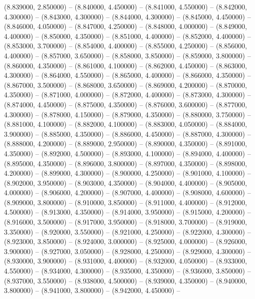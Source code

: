 (8.839000, 2.850000) -- 
(8.840000, 4.450000) -- 
(8.841000, 4.550000) -- 
(8.842000, 4.300000) -- 
(8.843000, 4.300000) -- 
(8.844000, 4.300000) -- 
(8.845000, 4.450000) -- 
(8.846000, 4.050000) -- 
(8.847000, 4.250000) -- 
(8.848000, 4.000000) -- 
(8.849000, 4.400000) -- 
(8.850000, 4.350000) -- 
(8.851000, 4.400000) -- 
(8.852000, 4.400000) -- 
(8.853000, 3.700000) -- 
(8.854000, 4.400000) -- 
(8.855000, 4.250000) -- 
(8.856000, 4.400000) -- 
(8.857000, 3.650000) -- 
(8.858000, 3.850000) -- 
(8.859000, 3.800000) -- 
(8.860000, 4.350000) -- 
(8.861000, 4.100000) -- 
(8.862000, 4.450000) -- 
(8.863000, 4.300000) -- 
(8.864000, 4.550000) -- 
(8.865000, 4.400000) -- 
(8.866000, 4.350000) -- 
(8.867000, 3.500000) -- 
(8.868000, 3.650000) -- 
(8.869000, 4.200000) -- 
(8.870000, 4.350000) -- 
(8.871000, 4.000000) -- 
(8.872000, 4.400000) -- 
(8.873000, 4.300000) -- 
(8.874000, 4.450000) -- 
(8.875000, 4.350000) -- 
(8.876000, 3.600000) -- 
(8.877000, 4.300000) -- 
(8.878000, 4.150000) -- 
(8.879000, 4.350000) -- 
(8.880000, 3.750000) -- 
(8.881000, 4.100000) -- 
(8.882000, 4.100000) -- 
(8.883000, 4.050000) -- 
(8.884000, 3.900000) -- 
(8.885000, 4.350000) -- 
(8.886000, 4.450000) -- 
(8.887000, 4.300000) -- 
(8.888000, 4.200000) -- 
(8.889000, 2.950000) -- 
(8.890000, 4.350000) -- 
(8.891000, 4.350000) -- 
(8.892000, 4.500000) -- 
(8.893000, 4.100000) -- 
(8.894000, 4.400000) -- 
(8.895000, 4.350000) -- 
(8.896000, 3.800000) -- 
(8.897000, 4.350000) -- 
(8.898000, 4.200000) -- 
(8.899000, 4.300000) -- 
(8.900000, 4.250000) -- 
(8.901000, 4.100000) -- 
(8.902000, 3.950000) -- 
(8.903000, 4.350000) -- 
(8.904000, 4.400000) -- 
(8.905000, 4.000000) -- 
(8.906000, 4.200000) -- 
(8.907000, 4.400000) -- 
(8.908000, 4.600000) -- 
(8.909000, 3.800000) -- 
(8.910000, 3.850000) -- 
(8.911000, 4.400000) -- 
(8.912000, 4.500000) -- 
(8.913000, 4.350000) -- 
(8.914000, 3.950000) -- 
(8.915000, 4.200000) -- 
(8.916000, 3.500000) -- 
(8.917000, 3.950000) -- 
(8.918000, 3.700000) -- 
(8.919000, 3.350000) -- 
(8.920000, 3.550000) -- 
(8.921000, 4.250000) -- 
(8.922000, 4.300000) -- 
(8.923000, 3.850000) -- 
(8.924000, 3.000000) -- 
(8.925000, 4.000000) -- 
(8.926000, 3.900000) -- 
(8.927000, 3.050000) -- 
(8.928000, 4.250000) -- 
(8.929000, 4.300000) -- 
(8.930000, 3.900000) -- 
(8.931000, 4.400000) -- 
(8.932000, 4.050000) -- 
(8.933000, 4.550000) -- 
(8.934000, 4.300000) -- 
(8.935000, 4.350000) -- 
(8.936000, 3.850000) -- 
(8.937000, 3.550000) -- 
(8.938000, 4.500000) -- 
(8.939000, 4.350000) -- 
(8.940000, 3.800000) -- 
(8.941000, 3.800000) -- 
(8.942000, 4.450000) -- 
